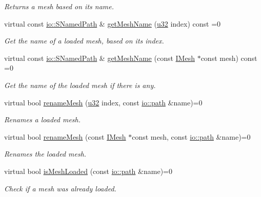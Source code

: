 \begin{DoxyCompactItemize}
\begin{DoxyCompactList}\small\item\em Returns a mesh based on its name. \end{DoxyCompactList}\item 
virtual const \hyperlink{structirr_1_1io_1_1SNamedPath}{io\+::\+S\+Named\+Path} \& \hyperlink{classirr_1_1scene_1_1IMeshCache_af06efb8fb21f6bba16e52d879b5d3ddd}{get\+Mesh\+Name} (\hyperlink{namespaceirr_a0416a53257075833e7002efd0a18e804}{u32} index) const =0
\begin{DoxyCompactList}\small\item\em Get the name of a loaded mesh, based on its index. \end{DoxyCompactList}\item 
virtual const \hyperlink{structirr_1_1io_1_1SNamedPath}{io\+::\+S\+Named\+Path} \& \hyperlink{classirr_1_1scene_1_1IMeshCache_a7271fa1247b8c1198c196dc947b5ede0}{get\+Mesh\+Name} (const \hyperlink{classirr_1_1scene_1_1IMesh}{I\+Mesh} $\ast$const mesh) const =0
\begin{DoxyCompactList}\small\item\em Get the name of the loaded mesh if there is any. \end{DoxyCompactList}\item 
virtual bool \hyperlink{classirr_1_1scene_1_1IMeshCache_a820743b703cdc4362a3dbe6664271bcb}{rename\+Mesh} (\hyperlink{namespaceirr_a0416a53257075833e7002efd0a18e804}{u32} index, const \hyperlink{namespaceirr_1_1io_a6468281622ce3a1c46b72e19f32dded5}{io\+::path} \&name)=0
\begin{DoxyCompactList}\small\item\em Renames a loaded mesh. \end{DoxyCompactList}\item 
virtual bool \hyperlink{classirr_1_1scene_1_1IMeshCache_a4533c81f4f3df112fa106d6fb1118f3b}{rename\+Mesh} (const \hyperlink{classirr_1_1scene_1_1IMesh}{I\+Mesh} $\ast$const mesh, const \hyperlink{namespaceirr_1_1io_a6468281622ce3a1c46b72e19f32dded5}{io\+::path} \&name)=0
\begin{DoxyCompactList}\small\item\em Renames the loaded mesh. \end{DoxyCompactList}\item 
virtual bool \hyperlink{classirr_1_1scene_1_1IMeshCache_a42a13fab5b76ab7142a1d47dac80548b}{is\+Mesh\+Loaded} (const \hyperlink{namespaceirr_1_1io_a6468281622ce3a1c46b72e19f32dded5}{io\+::path} \&name)=0
\begin{DoxyCompactList}\small\item\em Check if a mesh was already loaded. \end{DoxyCompactList}\item 

\end{DoxyCompactItemize}
